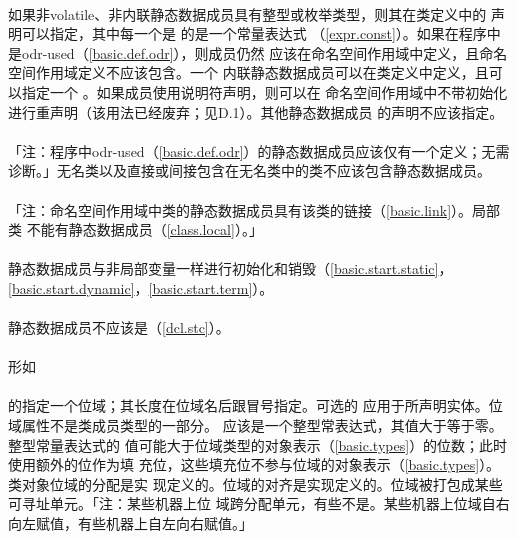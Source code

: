 \paragraph{}
如果非volatile、非内联静态数据成员具有整型或枚举类型，则其在类定义中的
声明可以指定，其中每一个是
的是一个常量表达式
（\ref{expr.const}）。如果在程序中是odr-used（\ref{basic.def.odr}），则成员仍然
应该在命名空间作用域中定义，且命名空间作用域定义不应该包含。一个
内联静态数据成员可以在类定义中定义，且可以指定一个
。如果成员使用说明符声明，则可以在
命名空间作用域中不带初始化进行重声明（该用法已经废弃；见D.1）。其他静态数据成员
的声明不应该指定。

\paragraph{}
「注：程序中odr-used（\ref{basic.def.odr}）的静态数据成员应该仅有一个定义；无需
诊断。」无名类以及直接或间接包含在无名类中的类不应该包含静态数据成员。

\paragraph{}
「注：命名空间作用域中类的静态数据成员具有该类的链接（\ref{basic.link}）。局部类
不能有静态数据成员（\ref{class.local}）。」

\paragraph{}
静态数据成员与非局部变量一样进行初始化和销毁（\ref{basic.start.static}，
\ref{basic.start.dynamic}，\ref{basic.start.term}）。

\paragraph{}
静态数据成员不应该是（\ref{dcl.stc}）。

\paragraph{}
形如                                                                          \\
\mbox{}                                                  \\
的指定一个位域；其长度在位域名后跟冒号指定。可选的
应用于所声明实体。位域属性不是类成员类型的一部分。
应该是一个整型常表达式，其值大于等于零。整型常量表达式的
值可能大于位域类型的对象表示（\ref{basic.types}）的位数；此时使用额外的位作为填
充位，这些填充位不参与位域的对象表示（\ref{basic.types}）。类对象位域的分配是实
现定义的。位域的对齐是实现定义的。位域被打包成某些可寻址单元。「注：某些机器上位
域跨分配单元，有些不是。某些机器上位域自右向左赋值，有些机器上自左向右赋值。」

